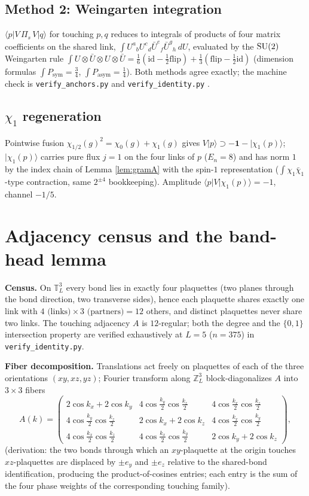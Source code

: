 \subsection{Method 2: Weingarten integration}
$\langle p|V\,\Pi_s\,V|q\rangle$ for touching $p,q$ reduces to integrals of
products of four matrix coefficients on the shared link,
$\int U^a{}_bU^c{}_d\bar U^e{}_f\bar U^g{}_h\,dU$, evaluated by the ${\mathrm{SU}}(2)$
Weingarten rule
$\int U\otimes\bar U\otimes U\otimes\bar U
=\tfrac{1}{6}(\text{id}-\tfrac12\text{flip})
+\tfrac{1}{3}(\text{flip}-\tfrac12\text{id})$
(dimension formulas $\int P_{\mathrm{sym}}=\tfrac34$,
$\int P_{\mathrm{asym}}=\tfrac14$). Both methods agree exactly; the
machine check is \texttt{verify\_anchors.py} and
\texttt{verify\_identity.py} \cite{YM04code}.

\subsection{$\chi_1$ regeneration}
Pointwise fusion $\chi_{1/2}(g)^2=\chi_0(g)+\chi_1(g)$ gives
$V|p\rangle\supset-\mathbf 1-|\chi_1(p)\rangle$; $|\chi_1(p)\rangle$ carries
pure flux $j=1$ on the four links of $p$ ($E_n=8$) and has norm $1$ by the
index chain of Lemma \ref{lem:gramA} with the spin-$1$ representation
($\int\chi_1\bar\chi_1$-type contraction, same $2^{\pm4}$ bookkeeping).
Amplitude $\langle p|V|\chi_1(p)\rangle=-1$, channel $-1/5$.

\section{Adjacency census and the band-head lemma}\label{app:C}
\textbf{Census.} On $\mathbb T_L^3$ every bond lies in exactly four
plaquettes (two planes through the bond direction, two transverse sides),
hence each plaquette shares exactly one link with $4\text{ (links)}\times
3\text{ (partners)}=12$ others, and distinct plaquettes never share two
links. The touching adjacency $A$ is $12$-regular; both the degree and the
$\{0,1\}$ intersection property are verified exhaustively at $L=5$
($n=375$) in \texttt{verify\_identity.py}.

\textbf{Fiber decomposition.} Translations act freely on plaquettes of each
of the three orientations $(xy,xz,yz)$; Fourier transform along
$\mathbb Z_L^3$ block-diagonalizes $A$ into $3\times3$ fibers
\[
A(k)=\begin{pmatrix}
2\cos k_x+2\cos k_y & 4\cos\tfrac{k_y}{2}\cos\tfrac{k_z}{2} &
4\cos\tfrac{k_x}{2}\cos\tfrac{k_z}{2}\\
4\cos\tfrac{k_y}{2}\cos\tfrac{k_z}{2} & 2\cos k_x+2\cos k_z &
4\cos\tfrac{k_x}{2}\cos\tfrac{k_y}{2}\\
4\cos\tfrac{k_x}{2}\cos\tfrac{k_z}{2} & 4\cos\tfrac{k_x}{2}\cos\tfrac{k_y}{2} &
2\cos k_y+2\cos k_z
\end{pmatrix},
\]
(derivation: the two bonds through which an $xy$-plaquette at the origin
touches $xz$-plaquettes are displaced by $\pm e_y$ and $\pm e_z$ relative to
the shared-bond identification, producing the product-of-cosines entries;
each entry is the sum of the four phase weights of the corresponding
touching family).

